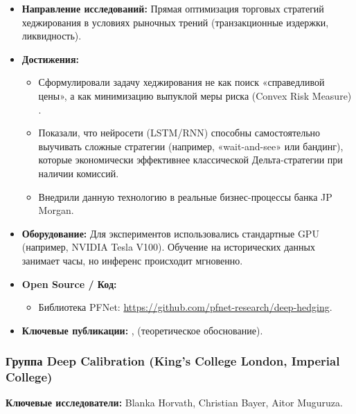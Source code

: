 \documentclass[12pt, a4paper]{article}
\begin{document}
\begin{itemize}
    \item \textbf{Направление исследований:} Прямая оптимизация торговых стратегий хеджирования в условиях рыночных трений (транзакционные издержки, ликвидность).
    \item \textbf{Достижения:}
    \begin{itemize}
        \item Сформулировали задачу хеджирования не как поиск «справедливой цены», а как минимизацию выпуклой меры риска (Convex Risk Measure) \cite{Buehler2019}.
        \item Показали, что нейросети (LSTM/RNN) способны самостоятельно выучивать сложные стратегии (например, «wait-and-see» или бандинг), которые экономически эффективнее классической Дельта-стратегии при наличии комиссий.
        \item Внедрили данную технологию в реальные бизнес-процессы банка JP Morgan.
    \end{itemize}
    \item \textbf{Оборудование:} Для экспериментов использовались стандартные GPU (например, NVIDIA Tesla V100). Обучение на исторических данных занимает часы, но инференс происходит мгновенно.
    \item \textbf{Open Source / Код:}
    \begin{itemize}
        \item Библиотека PFNet: \url{https://github.com/pfnet-research/deep-hedging}.
    \end{itemize}
    \item \textbf{Ключевые публикации:} \cite{Buehler2019}, \cite{Cuchiero2021} (теоретическое обоснование).
\end{itemize}

\subsubsection{Группа Deep Calibration (King's College London, Imperial College)}
\textbf{Ключевые исследователи:} Blanka Horvath, Christian Bayer, Aitor Muguruza.
\end{document}
